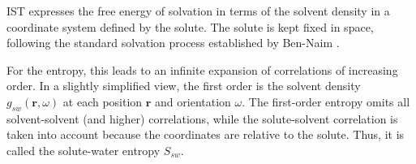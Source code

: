 \documentclass[9pt,tutorial]{livecoms}
\begin{document}

IST expresses the free energy of solvation in terms of the solvent density in a coordinate system defined by the solute.
The solute is kept fixed in space, following the standard solvation process established by Ben-Naim \cite{ben-naim-book}.

For the entropy, this leads to an infinite expansion of correlations of increasing order.
In a slightly simplified view, the first order is the solvent density $g_\textit{sw}\left(\textbf{r},\omega \right)$ at each position $\textbf{r}$ and orientation $\omega$.
The first-order entropy omits all solvent-solvent (and higher) correlations, while the solute-solvent correlation is taken into account because the coordinates are relative to the solute.
Thus, it is called the solute-water entropy $S_{sw}$.
\end{document}
